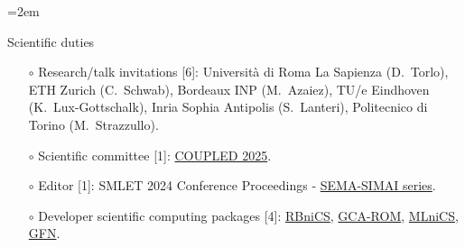 \documentclass[
  usegeometry%
]{scrartcl}
\newcommand{\Description}[1]{\hangindent=2em\hangafter=0\noindent\raggedright\footnotesize{#1}\par\normalsize\vspace{1em}} %
\begin{document}
\begin{cv}{}
\Description{{\color{cyan} Scientific duties}
\begin{itemize}
    \item[$\circ$] Research/talk invitations [6]: Università di Roma La Sapienza (D.\ Torlo), ETH Zurich (C.\ Schwab), Bordeaux INP (M.\ Azaiez), TU/e Eindhoven (K.\ Lux-Gottschalk), Inria Sophia Antipolis (S.\ Lanteri), Politecnico di Torino (M.\ Strazzullo).
    \item[$\circ$] Scientific committee [1]:  \href{https://coupled2025.cimne.com}{COUPLED 2025}.
    \item[$\circ$] Editor [1]: SMLET 2024 Conference Proceedings - \href{https://www.springer.com/series/10532?srsltid=AfmBOorA6rLcPZe58BDQIGK0K7oMzdRuX2yynRAPVQ16hqD9zvjfdef5}{SEMA-SIMAI series}.
    \item[$\circ$] Developer scientific computing packages [4]: \href{https://github.com/RBniCS/RBniCS}{RBniCS}, \href{https://github.com/fpichi/gca-rom}{GCA-ROM}, \href{https://github.com/MLniCS/MLniCS}{MLniCS}, \href{https://github.com/Oisin-M/GFN}{GFN}. 

\end{itemize}}
\end{cv}
\end{document}
